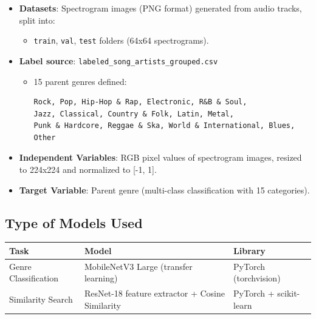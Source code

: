 \documentclass[
  letterpaper,
  DIV=11,
  numbers=noendperiod]{scrreprt}
\providecommand{\tightlist}{%
  \setlength{\itemsep}{0pt}\setlength{\parskip}{0pt}}
\begin{document}
\begin{itemize}
\item
  \textbf{Datasets}: Spectrogram images (PNG format) generated from
  audio tracks, split into:

  \begin{itemize}
  \tightlist
  \item
    \texttt{train}, \texttt{val}, \texttt{test} folders (64x64
    spectrograms).
  \end{itemize}
\item
  \textbf{Label source}: \texttt{labeled\_song\_artists\_grouped.csv}

  \begin{itemize}
  \item
    15 parent genres defined:

\begin{verbatim}
Rock, Pop, Hip-Hop & Rap, Electronic, R&B & Soul,
Jazz, Classical, Country & Folk, Latin, Metal,
Punk & Hardcore, Reggae & Ska, World & International, Blues, Other
\end{verbatim}
  \end{itemize}
\item
  \textbf{Independent Variables}: RGB pixel values of spectrogram
  images, resized to 224x224 and normalized to {[}-1, 1{]}.
\item
  \textbf{Target Variable}: Parent genre (multi-class classification
  with 15 categories).
\end{itemize}

\subsection{Type of Models Used}\label{type-of-models-used}

\begin{longtable}[]{@{}
  >{\raggedright\arraybackslash}p{}
  >{\raggedright\arraybackslash}p{}
  >{\raggedright\arraybackslash}p{}@{}}
\toprule\noalign{}
\begin{minipage}[b]{\linewidth}\raggedright
Task
\end{minipage} & \begin{minipage}[b]{\linewidth}\raggedright
Model
\end{minipage} & \begin{minipage}[b]{\linewidth}\raggedright
Library
\end{minipage} \\
\midrule\noalign{}
\endhead
\bottomrule\noalign{}
\endlastfoot
Genre Classification & MobileNetV3 Large (transfer learning) & PyTorch
(torchvision) \\
Similarity Search & ResNet-18 feature extractor + Cosine Similarity &
PyTorch + scikit-learn \\
\end{longtable}
\end{document}
